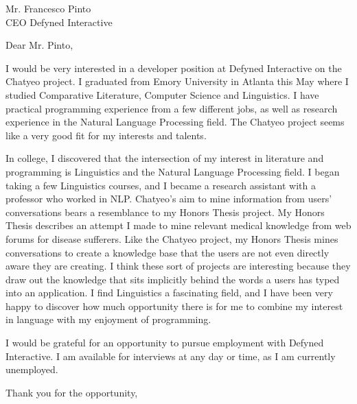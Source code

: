 
\signature{Walter Askew\\
  1745 Orrington Avenue\\
  Apartment 2N\\
  Evanston, IL 60201}

\begin{letter}{Mr. Francesco Pinto\\
    CEO Defyned Interactive}

  \opening{Dear Mr. Pinto,}
  
  I would be very interested in a developer position at Defyned
  Interactive on the Chatyeo project.
  I graduated from Emory University in Atlanta this May where I
  studied Comparative Literature, Computer Science and Linguistics.
  I have practical programming experience from a few different jobs,
  as well as research experience in the Natural Language Processing
  field.
  The Chatyeo project seems like a very good fit for my interests and
  talents.

  In college, I discovered that the intersection of my interest in
  literature and programming is Linguistics and the Natural Language
  Processing field.
  I began taking a few Linguistics courses, and I became a research
  assistant with a professor who worked in NLP.
  Chatyeo's aim to mine information from users' conversations bears a
  resemblance to my Honors Thesis project.
  My Honors Thesis describes an attempt I made to mine relevant
  medical knowledge from web forums for disease sufferers.
  Like the Chatyeo project, my Honors Thesis mines conversations to
  create a knowledge base that the users are not even directly aware
  they are creating.
  I think these sort of projects are interesting because they draw out
  the knowledge that sits implicitly behind the words a users has
  typed into an application.
  I find Linguistics a fascinating field, and I have been very happy
  to discover how much opportunity there is for me to combine my
  interest in language with my enjoyment of programming.

  I would be grateful for an opportunity to pursue employment with
  Defyned Interactive.
  I am available for interviews at any day or time, as I am
  currently unemployed.

  \closing{Thank you for the opportunity,}
\end{letter}
